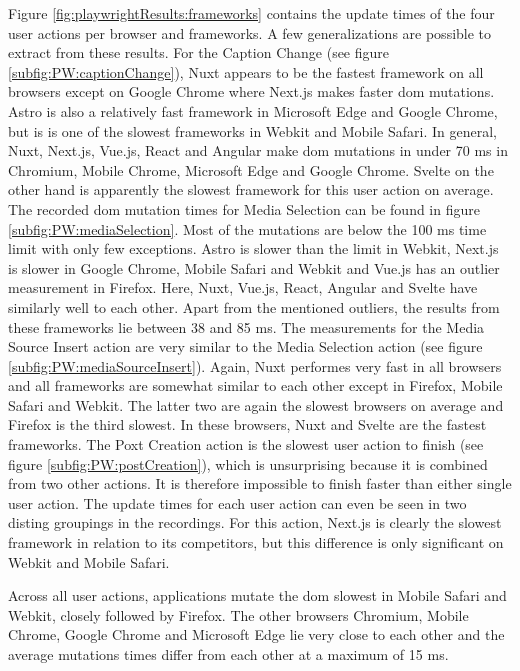 \documentclass[a4paper, 10pt]{article}
\begin{document}
Figure \ref{fig:playwrightResults:frameworks} contains the update times of the four user actions per browser and frameworks.
A few generalizations are possible to extract from these results.
For the Caption Change (see figure \ref{subfig:PW:captionChange}), Nuxt appears to be the fastest framework on all browsers except on Google Chrome where Next.js makes faster \acrshort{dom} mutations.
Astro is also a relatively fast framework in Microsoft Edge and Google Chrome, but is is one of the slowest frameworks in Webkit and Mobile Safari.
In general, Nuxt, Next.js, Vue.js, React and Angular make \acrshort{dom} mutations in under 70 ms in Chromium, Mobile Chrome, Microsoft Edge and Google Chrome.
Svelte on the other hand is apparently the slowest framework for this user action on average.
The recorded \acrshort{dom} mutation times for Media Selection can be found in figure \ref{subfig:PW:mediaSelection}.
Most of the mutations are below the 100 ms time limit with only few exceptions.
Astro is slower than the limit in Webkit, Next.js is slower in Google Chrome, Mobile Safari and Webkit and Vue.js has an outlier measurement in Firefox.
Here, Nuxt, Vue.js, React, Angular and Svelte have similarly well to each other.
Apart from the mentioned outliers, the results from these frameworks lie between 38 and 85 ms.
The measurements for the Media Source Insert action are very similar to the Media Selection action (see figure \ref{subfig:PW:mediaSourceInsert}).
Again, Nuxt performes very fast in all browsers and all frameworks are somewhat similar to each other except in Firefox, Mobile Safari and Webkit.
The latter two are again the slowest browsers on average and Firefox is the third slowest.
In these browsers, Nuxt and Svelte are the fastest frameworks.
The Poxt Creation action is the slowest user action to finish (see figure \ref{subfig:PW:postCreation}), which is unsurprising because it is combined from two other actions.
It is therefore impossible to finish faster than either single user action.
The update times for each user action can even be seen in two disting groupings in the recordings.
For this action, Next.js is clearly the slowest framework in relation to its competitors, but this difference is only significant on Webkit and Mobile Safari.

Across all user actions, applications mutate the \acrshort{dom} slowest in Mobile Safari and Webkit, closely followed by Firefox.
The other browsers Chromium, Mobile Chrome, Google Chrome and Microsoft Edge lie very close to each other and the average mutations times differ from each other at a maximum of 15 ms.
\end{document}
